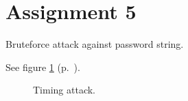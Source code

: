\section*{Assignment 5}

Bruteforce attack against password string.

See figure \ref{as5-schematic} (p.~\pageref{as5-schematic}).

\begin{figure}[htb]
    \begin{center}
        
        \caption{Timing attack.}
        \label{as5-schematic}
    \end{center}
\end{figure}
